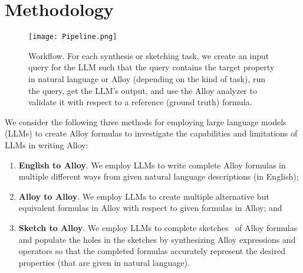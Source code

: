 \section{Methodology}
\label{sec:approach}

\begin{figure}[!t]
\centering
\texttt{[image: Pipeline.png]}
\caption{Workflow. For each synthesis or sketching task, we create an input query for the LLM such that the query contains the target property in natural language or Alloy (depending on the kind of task), run the query, get the LLM's output, and use the Alloy analyzer to validate it with respect to a reference (ground truth) formula.}
\label{fig:workflow}
\end{figure}

We consider the following three methods for employing large language models (LLMs) to create Alloy formulas to investigate the capabilities and limitations of LLMs in writing Alloy:

\begin{enumerate}
\item
{\bf English to Alloy}. We employ LLMs to write complete Alloy formulas in multiple different ways from given natural language descriptions (in English);
\item
{\bf Alloy to Alloy}. We employ LLMs to create multiple alternative but equivalent formulas in Alloy with respect to given formulas in Alloy; and
\item
{\bf Sketch to Alloy}. We employ LLMs to complete sketches~\cite{SolarLazemaPhD2008,WangETALABZ2018ASketch} of Alloy
formulas and populate the holes in the sketches by synthesizing Alloy
expressions and operators so that the completed formulas accurately
represent the desired properties (that are given in natural language).  \end{enumerate}



